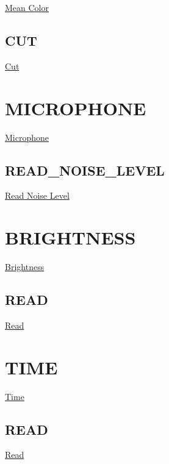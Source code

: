 \hyperlink{cmd_doc_MeanColor}{Mean Color}\hypertarget{cmd_structure_PICTURE_ACCU_CUT}{}\subsection{C\-U\-T}\label{cmd_structure_PICTURE_ACCU_CUT}
\hyperlink{cmd_doc_Cut}{Cut}\hypertarget{cmd_structure_MICROPHONE}{}\section{M\-I\-C\-R\-O\-P\-H\-O\-N\-E}\label{cmd_structure_MICROPHONE}
\hyperlink{modul_doc_Microphone}{Microphone}\hypertarget{cmd_structure_MICROPHONE_READ_NOISE_LEVEL}{}\subsection{R\-E\-A\-D\-\_\-\-N\-O\-I\-S\-E\-\_\-\-L\-E\-V\-E\-L}\label{cmd_structure_MICROPHONE_READ_NOISE_LEVEL}
\hyperlink{cmd_doc_ReadNoiseLevel}{Read Noise Level}\hypertarget{cmd_structure_BRIGHTNESS}{}\section{B\-R\-I\-G\-H\-T\-N\-E\-S\-S}\label{cmd_structure_BRIGHTNESS}
\hyperlink{modul_doc_Brightness}{Brightness}\hypertarget{cmd_structure_BRIGHTNESS_READ}{}\subsection{R\-E\-A\-D}\label{cmd_structure_BRIGHTNESS_READ}
\hyperlink{cmd_doc_Read}{Read}\hypertarget{cmd_structure_TIME}{}\section{T\-I\-M\-E}\label{cmd_structure_TIME}
\hyperlink{modul_doc_Time}{Time}\hypertarget{cmd_structure_TIME_READ}{}\subsection{R\-E\-A\-D}\label{cmd_structure_TIME_READ}
\hyperlink{cmd_doc_Read}{Read} 